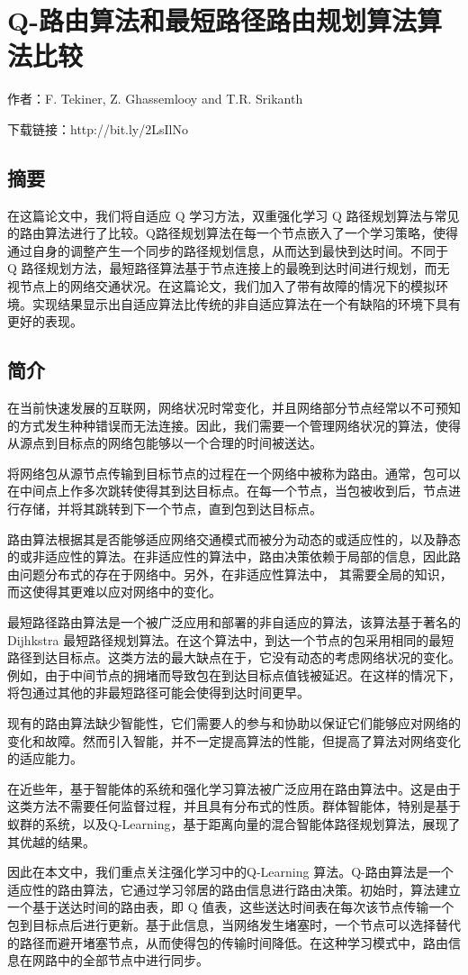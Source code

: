 \documentclass{standalone}
\begin{document}
\thesistranslationchinese

\section*{Q-路由算法和最短路径路由规划算法算法比较}
作者：F. Tekiner, Z. Ghassemlooy and T.R. Srikanth\par
下载链接：http://bit.ly/2LsIlNo
\subsection*{摘要}
在这篇论文中，我们将自适应 Q 学习方法，双重强化学习 Q 路径规划算法与常见的路由算法进行了比较。Q路径规划算法在每一个节点嵌入了一个学习策略，使得通过自身的调整产生一个同步的路径规划信息，从而达到最快到达时间。不同于 Q 路径规划方法，最短路径算法基于节点连接上的最晚到达时间进行规划，而无视节点上的网络交通状况。在这篇论文，我们加入了带有故障的情况下的模拟环境。实现结果显示出自适应算法比传统的非自适应算法在一个有缺陷的环境下具有更好的表现。
\subsection*{简介}
在当前快速发展的互联网，网络状况时常变化，并且网络部分节点经常以不可预知的方式发生种种错误而无法连接。因此，我们需要一个管理网络状况的算法，使得从源点到目标点的网络包能够以一个合理的时间被送达。\par
将网络包从源节点传输到目标节点的过程在一个网络中被称为路由。通常，包可以在中间点上作多次跳转使得其到达目标点。在每一个节点，当包被收到后，节点进行存储，并将其跳转到下一个节点，直到包到达目标点。\par
路由算法根据其是否能够适应网络交通模式而被分为动态的或适应性的，以及静态的或非适应性的算法。在非适应性的算法中，路由决策依赖于局部的信息，因此路由问题分布式的存在于网络中。另外，在非适应性算法中， 其需要全局的知识，而这使得其更难以应对网络中的变化。\par
最短路径路由算法是一个被广泛应用和部署的非自适应的算法，该算法基于著名的 Dijhkstra 最短路径规划算法。在这个算法中，到达一个节点的包采用相同的最短路径到达目标点。这类方法的最大缺点在于，它没有动态的考虑网络状况的变化。例如，由于中间节点的拥堵而导致包在到达目标点值钱被延迟。在这样的情况下，将包通过其他的非最短路径可能会使得到达时间更早。\par
现有的路由算法缺少智能性，它们需要人的参与和协助以保证它们能够应对网络的变化和故障。然而引入智能，并不一定提高算法的性能，但提高了算法对网络变化的适应能力。\par
在近些年，基于智能体的系统和强化学习算法被广泛应用在路由算法中。这是由于这类方法不需要任何监督过程，并且具有分布式的性质。群体智能体，特别是基于蚁群的系统，以及Q-Learning，基于距离向量的混合智能体路径规划算法，展现了其优越的结果。\par
因此在本文中，我们重点关注强化学习中的Q-Learning 算法。Q-路由算法是一个适应性的路由算法，它通过学习邻居的路由信息进行路由决策。初始时，算法建立一个基于送达时间的路由表，即 Q 值表，这些送达时间表在每次该节点传输一个包到目标点后进行更新。基于此信息，当网络发生堵塞时，一个节点可以选择替代的路径而避开堵塞节点，从而使得包的传输时间降低。在这种学习模式中，路由信息在网路中的全部节点中进行同步。
\end{document}
